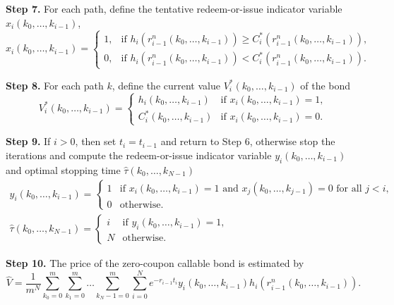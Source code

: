 \documentclass[reqno]{amsart}
\begin{document}
\noindent\textbf{Step 7.} For each path, define the tentative redeem-or-issue indicator 
variable $x_i\left(k_0,\dots,k_{i-1}\right)$,
\[
 x_i\left(k_0,\dots,k_{i-1}\right)
 =\begin{cases}
1, & \text{if } h_i\left(r_{i-1}^{n}\left(k_0,\dots,k_{i-1}\right)\right)
 \geq C_i^*\left(r_{i-1}^{n}\left(k_0,\dots,k_{i-1}\right)\right) ,\\
0, & \text{if } h_i\left(r_{i-1}^{n}\left(k_0,\dots,k_{i-1}\right)
 \right)<C_i^*\left(r_{i-1}^{n}\left(k_0,\dots,k_{i-1}\right)\right).
\end{cases}
\]
\smallskip

\noindent\textbf{Step 8.} For each path $k$, define the current value 
$V_i^*\left(k_0,\dots,k_{i-1}\right)$ of the bond
\[
 V_i^*\left(k_0,\dots,k_{i-1}\right)
 = \begin{cases}
 h_i\left(k_0,\dots,k_{i-1}\right) & \text{if } x_i\left(k_0,\dots,k_{i-1}\right)=1, \\
 C_i^*\left(k_0,\dots,k_{i-1}\right) & \text{if } x_i\left(k_0,\dots,k_{i-1}\right)=0 .
 \end{cases}
\]
\smallskip

\noindent\textbf{Step 9.} If $i>0$, then set $t_i=t_{i-1}$ and return to Step 6, 
otherwise stop the iterations and compute the redeem-or-issue indicator variable 
$y_i\left(k_0,\dots,k_{i-1}\right)$ and optimal stopping time
$\hat{\tau}\left(k_0,\dots,k_{N-1}\right)$
\begin{gather*}
 y_i\left(k_0,\dots,k_{i-1}\right)
 = \begin{cases}1 & \text{if } x_i\left(k_0,\dots,k_{i-1}\right)=1 
 \text{ and } x_j\left(k_0,\dots,k_{j-1}\right)=0 \text{ for all } j<i, \\
 0 & \text{otherwise. }
 \end{cases}
\\
 \hat{\tau}\left(k_0,\dots,k_{N-1}\right)
 = \begin{cases}i & \text{if } y_i\left(k_0,\dots,k_{i-1}\right)=1 , \\
 N & \text{otherwise.}
 \end{cases}
\end{gather*}
\smallskip

\noindent\textbf{Step 10.} The price of the zero-coupon callable bond is estimated by
\begin{equation}
\label{hatv}
 \hat{V}=\frac{1}{m^N} \sum_{k_0=0}^m \sum_{k_1=0}^m \dots \sum_{k_N-1=0}^m
 \sum_{i=0}^N e^{-r_{i-1} t_i} y_i\left(k_0,\dots,k_{i-1}\right)
  h_i\left(r_{i-1}^{n}\left(k_0,\dots,k_{i-1}\right)\right).
\end{equation}
\end{document}
